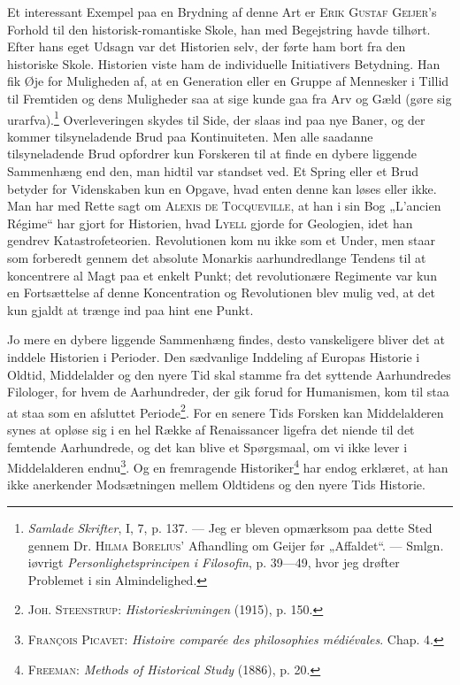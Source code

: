 \documentclass[12pt]{article}
\newcommand{\opage}[1]{\marginnote{\footnotesize\textit{[#1]}}}
\begin{document}
Et interessant Exempel paa en Brydning af denne Art er \textsc{Erik Gustaf
Geijer}'s Forhold til den historisk-romantiske Skole, han med Begejstring havde
tilhørt.
\setcounter{footnote}{0}%
\opage{63}Efter hans eget Udsagn var det Historien selv, der førte ham bort fra den
historiske Skole. Historien viste ham de individuelle Initiativers Betydning. Han
fik Øje for Muligheden af, at en Generation eller en Gruppe af Mennesker i Tillid
til Fremtiden og dens Muligheder saa at sige kunde gaa fra Arv og Gæld (gøre sig
urarfva).\footnote{%
\textit{Samlade Skrifter}, I, 7, p. 137. --- Jeg er bleven
opmærksom paa dette Sted gennem Dr. \textsc{Hilma Borelius}' Afhandling om Geijer
før „Affaldet“. --- Smlgn. iøvrigt \textit{Personlighetsprincipen i Filosofin},
p. 39---49, hvor jeg drøfter Problemet i sin Almindelighed.} Overleveringen skydes
til Side, der slaas ind paa nye Baner, og der kommer tilsyneladende Brud paa
Kontinuiteten. Men alle saadanne tilsyneladende Brud opfordrer kun Forskeren til
at finde en dybere liggende Sammenhæng end den, man hidtil var standset ved. Et
Spring eller et Brud betyder for Videnskaben kun en Opgave, hvad enten denne kan
løses eller ikke. Man har med Rette sagt om \textsc{Alexis de Tocqueville}, at han
i sin Bog „L'ancien Régime“ har gjort for Historien, hvad \textsc{Lyell} gjorde
for Geologien, idet han gendrev Katastrofeteorien. Revolutionen kom nu ikke som et
Under, men staar som forberedt gennem det absolute Monarkis aarhundredlange
Tendens til at koncentrere al Magt paa et enkelt Punkt; det revolutionære
Regimente var kun en Fortsættelse af denne Koncentration og Revolutionen blev
mulig ved, at det kun gjaldt at trænge ind paa hint ene Punkt.

Jo mere en dybere liggende Sammenhæng findes, desto vanskeligere bliver det at
inddele Historien i Perioder. Den sædvanlige Inddeling af Europas Historie i
Oldtid, Middelalder og den nyere Tid skal stamme fra det syttende Aarhundredes
Filologer, for hvem de Aarhundreder, der gik forud for Humanismen, kom til staa
at staa som en afsluttet Periode\footnote{\textsc{Joh. Steenstrup}:
\textit{Historieskrivningen} (1915), p. 150.}. For en senere Tids Forsken kan
Middelalderen synes at opløse sig i en hel Række af Renaissancer ligefra det
niende til det femtende Aarhundrede, og det kan blive et Spørgsmaal, om vi ikke
lever i Middelalderen endnu\footnote{\textsc{François Picavet}: \textit{Histoire
comparée des philosophies médiévales}. Chap. 4.}. Og en fremragende
Historiker\footnote{\textsc{Freeman}: \textit{Methods of Historical Study} (1886),
p. 20.} har endog erklæret, at han ikke anerkender Modsætningen mellem Oldtidens og
den nyere Tids Historie.
\end{document}
